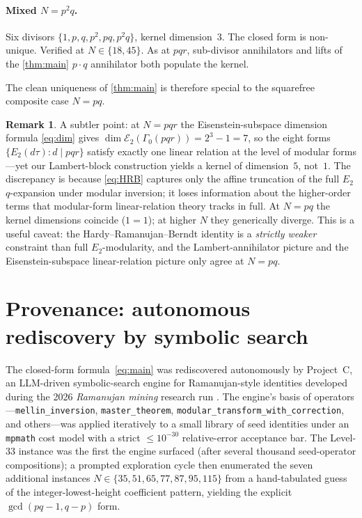 \documentclass[11pt,reqno]{amsart}
\theoremstyle{definition}
\newtheorem{remark}[theorem]{Remark}
\newcommand{\Eis}{\mathcal{E}}
\begin{document}
\paragraph{Mixed $N = p^2 q$.}
Six divisors $\{1, p, q, p^2, pq, p^2 q\}$, kernel dimension~$3$. The
closed form is non-unique. Verified at $N \in \{18, 45\}$. As at
$pqr$, sub-divisor annihilators and lifts of the \cref{thm:main}
$p \cdot q$ annihilator both populate the kernel.

The clean uniqueness of \cref{thm:main} is therefore special to the
squarefree composite case $N = pq$.

\begin{remark}\label{rem:caveat}
A subtler point: at $N = pqr$ the Eisenstein-subspace dimension
formula \eqref{eq:dim} gives $\dim \Eis_2(\Gamma_0(pqr)) = 2^3 - 1 = 7$,
so the eight forms $\{E_2(d\tau) : d \mid pqr\}$ satisfy exactly one
linear relation at the level of modular forms---yet our Lambert-block
construction yields a kernel of dimension~$5$, not~$1$. The
discrepancy is because \cref{eq:HRB} captures only the affine
truncation of the full $E_2$ $q$-expansion under modular inversion;
it loses information about the higher-order terms that modular-form
linear-relation theory tracks in full. At $N = pq$ the kernel
dimensions coincide ($1 = 1$); at higher $N$ they generically
diverge. This is a useful caveat: the Hardy--Ramanujan--Berndt
identity is a \emph{strictly weaker} constraint than full
$E_2$-modularity, and the Lambert-annihilator picture and the
Eisenstein-subspace linear-relation picture only agree at $N = pq$.
\end{remark}

\section{Provenance: autonomous rediscovery by symbolic search}\label{sec:provenance}

The closed-form formula~\eqref{eq:main} was rediscovered autonomously
by Project~C, an LLM-driven symbolic-search engine for
Ramanujan-style identities developed during the 2026
\emph{Ramanujan mining} research run \cite{ProjectC}. The engine's
basis of operators---\verb|mellin_inversion|, \verb|master_theorem|,
\verb|modular_transform_with_correction|, and others---was applied
iteratively to a small library of seed identities under an
\texttt{mpmath} cost model with a strict $\le 10^{-30}$ relative-error
acceptance bar. The Level-$33$ instance was the first the engine
surfaced (after several thousand seed-operator compositions); a
prompted exploration cycle then enumerated the seven additional
instances $N \in \{35, 51, 65, 77, 87, 95, 115\}$ from a
hand-tabulated guess of the integer-lowest-height coefficient
pattern, yielding the explicit $\gcd(pq-1, q-p)$ form.
\end{document}
